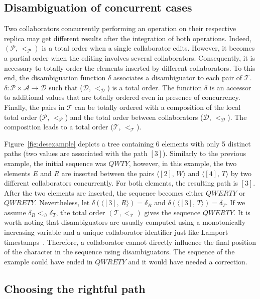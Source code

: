 \subsection{Disambiguation of concurrent cases}

Two collaborators concurrently performing an operation on their respective
replica may get different results after the integration of both
operations. Indeed, $(\mathcal{P},\,<_\mathcal{P})$ is a total order when a
single collaborator edits. However, it becomes a partial order when the editing
involves several collaborators. Consequently, it is necessary to totally order
the elements inserted by different collaborators. To this end, the
disambiguation function $\delta$ associates a disambiguator to each pair of
$\mathcal{T}$. $\delta: \mathcal{P}\times\mathcal{A} \rightarrow \mathcal{D}$
such that ($\mathcal{D}$, $<_{\mathcal{D}}$) is a total order. The function
$\delta$ is an accessor to additional values that are totally ordered even in
presence of concurrency. Finally, the pairs in $\mathcal{T}$ can be totally
ordered with a composition of the local total order ($\mathcal{P}$,
$<_{\mathcal{P}}$) and the total order between collaborators ($\mathcal{D}$,
$<_{\mathcal{D}}$). The composition leads to a total order ($\mathcal{T}$,
$<_{\mathcal{T}}$).

Figure~\ref{fig:desexample} depicts a tree containing 6 elements with only 5
distinct paths (two values are associated with the path $[3]$). Similarly to
the previous example, the initial sequence was $QWTY$, however, in this
example, the two elements $E$ and $R$ are inserted between the pairs
$\langle [2],\, W\rangle$ and $\langle [4],\,T\rangle$ by two different
collaborators concurrently. For both elements, the resulting path is
$[3]$. After the two elements are inserted, the sequence becomes either
$QWERTY$ or $QWRETY$. Nevertheless, let
$\delta(\langle [3],\, R \rangle) = \delta_R$ and
$\delta(\langle [3],\, T\rangle) = \delta_T$. If we assume
$\delta_R <_\mathcal{D} \delta_T$, the total order
$(\mathcal{T}, <_\mathcal{T})$ gives the sequence $QWERTY$. It is worth noting
that disambiguators are usually computed using a monotonically increasing
variable and a unique collaborator identifier just like Lamport
timestamps~\cite{lamport1978time}. Therefore, a collaborator cannot directly
influence the final position of the character in the sequence using
disambiguators. The sequence of the example could have ended in $QWRETY$ and it
would have needed a correction.

\subsection{Choosing the rightful path}
\label{subsec:choosing}

